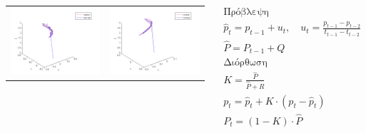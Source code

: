 \documentclass[8pt,sans,mathserif]{beamer}%
\begin{document}
\begin{frame}
\begin{columns}
\begin{tabular}{cc}
            \includegraphics[height = 0.23\textheight, keepaspectratio]{fig/filter0-xyz.png} & \includegraphics[height = 0.23\textheight, keepaspectratio]{fig/filter3-xyz.png}
        \end{tabular}

        \pause

        \begin{equation*}
            \begin{gathered}
                \text{Πρόβλεψη} \\
                \hat{p}_{t} = p_{t-1} + u_{t}, \quad u_{t} = \frac{p_{t-1} - p_{t-2}}{t_{t-1} - t_{t-2}} \\
                \hat{P} = P_{t-1} + Q \\[.5cm]
                \text{Διόρθωση} \\
                Κ = \frac{\hat{P}}{\hat{P} + R}\\
                p_{t} = \hat{p}_{t} + K \cdot (p_{t} - \hat{p}_{t}) \\
                P_{t} = (1 - K) \cdot \hat{P}
            \end{gathered}
        \end{equation*}


\end{columns}
\end{frame}
\end{document}
